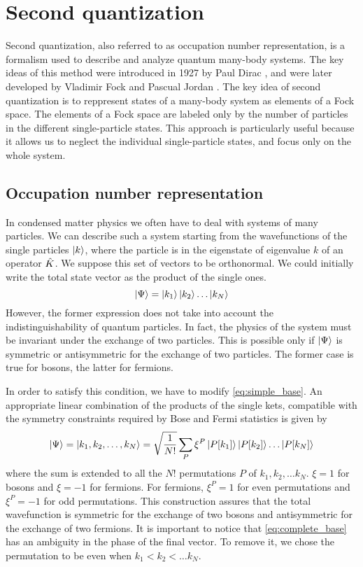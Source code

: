 \section{Second quantization} \label{sec:second_quantization}
Second quantization, also referred to as occupation number representation, is a formalism used to describe and analyze quantum many-body systems. The key ideas of this method were introduced in 1927 by Paul Dirac \cite{dirac1927}, and were later developed by Vladimir Fock and Pascual Jordan \cite{fock1932}. The key idea of second quantization is to reppresent states of a many-body system as elements of a Fock space. The elements of a Fock space are labeled only by the number of particles in the different single-particle states. This approach is particularly useful because it allows us to neglect the individual single-particle states, and focus only on the whole system.

\subsection{Occupation number representation}
In condensed matter physics we often have to deal with systems of many particles. We can describe such a system starting from the wavefunctions of the single particles $\ket{k}$, where the particle is in the eigenstate of eigenvalue $k$ of an operator $\hat{K}$. We suppose this set of vectors to be orthonormal. We could initially write the total state vector as the product of the single ones.
\begin{equation} \label{eq:simple_base}
    \ket{\Psi} = \ket{k_1}\ket{k_2}\dots\ket{k_N}
\end{equation}
However, the former expression does not take into account the indistinguishability of quantum particles. In fact, the physics of the system must be invariant under the exchange of two particles. This is possible only if $\ket{\Psi}$ is symmetric or antisymmetric for the exchange of two particles. The former case is true for bosons, the latter for fermions. %

In order to satisfy this condition, we have to modify \cref{eq:simple_base}. An appropriate linear combination of the products of the single kets, compatible with the symmetry constraints required by Bose and Fermi statistics is given by
\begin{equation} \label{eq:complete_base}
    \ket{\Psi} = \ket{k_1, k_2, \dots, k_N} = \sqrt{\frac{1}{N!}} \sum_P \xi^P \ket{P[k_1]}\ket{P[k_2]}\dots\ket{P[k_N]}
\end{equation}
where the sum is extended to all the $N!$ permutations $P$ of ${k_1, k_2, \dots k_N}$. $\xi = 1$ for bosons and $\xi = -1$ for fermions. For fermions, $\xi^P = 1$ for even permutations and $\xi^P = -1$ for odd permutations. This construction assures that the total wavefunction is symmetric for the exchange of two bosons and antisymmetric for the exchange of two fermions. It is important to notice that \cref{eq:complete_base} has an ambiguity in the phase of the final vector. To remove it, we chose the permutation to be even when $k_1 < k_2 < \dots k_N$.

